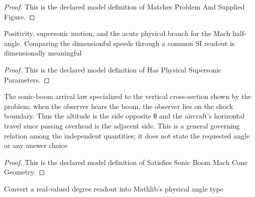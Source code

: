 \begin{proof}
  This is the declared model definition of Matches Problem And Supplied Figure.
\end{proof}
\begin{definition}
  \label{def:physics:phyx-mini-0220:phyxminiproblems-problemphyxmini0220-hasphysicalsupersonicparameters}
  Positivity, supersonic motion, and the acute physical branch for the Mach half-angle. Comparing the dimensionful speeds through a common SI readout is dimensionally meaningful
\end{definition}
\begin{proof}
  This is the declared model definition of Has Physical Supersonic Parameters.
\end{proof}
\begin{definition}
  \label{def:physics:phyx-mini-0220:phyxminiproblems-problemphyxmini0220-satisfiessonicboommachconegeometry}
  The sonic-boom arrival law specialized to the vertical cross-section shown by the problem: when the observer hears the boom, the observer lies on the shock boundary. Thus the altitude is the side opposite θ and the aircraft's horizontal travel since passing overhead is the adjacent side. This is a general governing relation among the independent quantities; it does not state the requested angle or any answer choice
\end{definition}
\begin{proof}
  This is the declared model definition of Satisfies Sonic Boom Mach Cone Geometry.
\end{proof}
\begin{definition}
  \label{def:physics:phyx-mini-0220:phyxminiproblems-problemphyxmini0220-angleofdegrees}
  Convert a real-valued degree readout into Mathlib's physical angle type
\end{definition}
